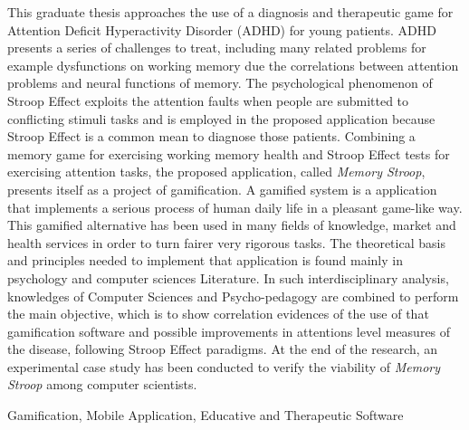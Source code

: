 This graduate thesis approaches the use of a diagnosis and therapeutic game for Attention Deficit Hyperactivity Disorder (ADHD) for young patients. ADHD presents a series of challenges to treat, including many related problems for example dysfunctions on working memory due the correlations between attention problems and neural functions of memory. The psychological phenomenon of Stroop Effect exploits the attention faults when people are submitted to conflicting stimuli tasks and is employed in the proposed application because Stroop Effect is a common mean to diagnose those patients. Combining a memory game for exercising working memory health and Stroop Effect tests for exercising attention tasks, the proposed application, called \textit{Memory Stroop}, presents itself as a project of gamification. A gamified system is a application that implements a serious process of human daily life in a pleasant game-like way. This gamified alternative has been used in many fields of knowledge, market and health services in order to turn fairer very rigorous tasks. The theoretical basis and principles needed to implement that application is found mainly in psychology and computer sciences Literature. In such interdisciplinary analysis, knowledges of Computer Sciences and Psycho-pedagogy are combined to perform the main objective, which is to show correlation evidences of the use of that gamification software and possible improvements in attentions level measures of the disease, following Stroop Effect paradigms. At the end of the research, an experimental case study has been conducted to verify the viability of \textit{Memory Stroop} among computer scientists.



\begin{keywords}
Gamification, Mobile Application, Educative and Therapeutic Software
\end{keywords}